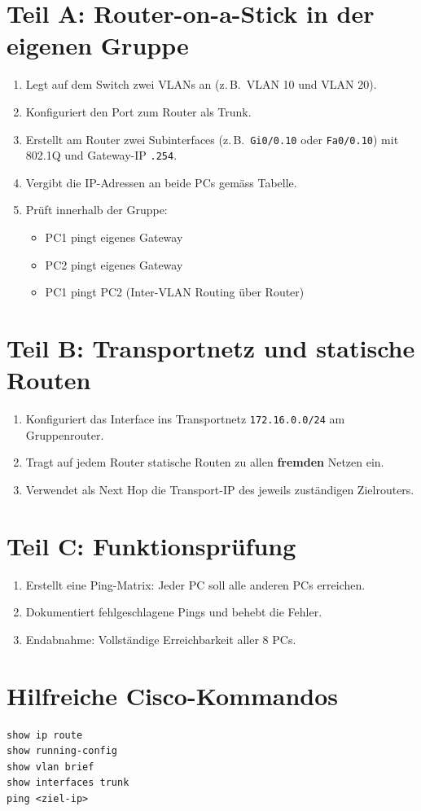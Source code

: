 \documentclass[11pt, oneside, numbers=noenddot]{scrbook}
\begin{document}
\section{Teil A: Router-on-a-Stick in der eigenen Gruppe}
\begin{enumerate}
\item Legt auf dem Switch zwei VLANs an (z.\,B.\ VLAN 10 und VLAN 20).
\item Konfiguriert den Port zum Router als Trunk.
\item Erstellt am Router zwei Subinterfaces (z.\,B.\ \texttt{Gi0/0.10} oder \texttt{Fa0/0.10}) mit 802.1Q und Gateway-IP \texttt{.254}.
\item Vergibt die IP-Adressen an beide PCs gemäss Tabelle.
\item Prüft innerhalb der Gruppe:
  \begin{itemize}
  \item PC1 pingt eigenes Gateway
  \item PC2 pingt eigenes Gateway
  \item PC1 pingt PC2 (Inter-VLAN Routing über Router)
  \end{itemize}
\end{enumerate}

\section{Teil B: Transportnetz und statische Routen}
\begin{enumerate}
\item Konfiguriert das Interface ins Transportnetz \texttt{172.16.0.0/24} am Gruppenrouter.
\item Tragt auf jedem Router statische Routen zu allen \textbf{fremden} Netzen ein.
\item Verwendet als Next Hop die Transport-IP des jeweils zuständigen Zielrouters.
\end{enumerate}

\section{Teil C: Funktionsprüfung}
\begin{enumerate}
\item Erstellt eine Ping-Matrix: Jeder PC soll alle anderen PCs erreichen.
\item Dokumentiert fehlgeschlagene Pings und behebt die Fehler.
\item Endabnahme: Vollständige Erreichbarkeit aller 8 PCs.
\end{enumerate}

\section{Hilfreiche Cisco-Kommandos}
\begin{verbatim}
show ip route
show running-config
show vlan brief
show interfaces trunk
ping <ziel-ip>
\end{verbatim}
\end{document}

